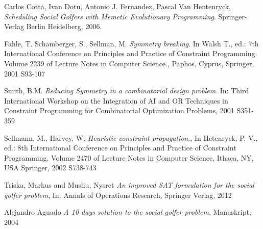     Carlos Cotta, Ivan Dotu, Antonio J. Fernandez, Pascal Van Hentenryck,
    \emph{Scheduling Social Golfers with Memetic Evolutionary Programming}.
    Springer-Verlag Berlin Heidelberg,
    2006.

    Fahle, T. Schamberger, S., Sellman, M.
    \emph{Symmetry breaking}.
    In Walsh T., ed.: 7th International Conference on Principles and Practice of Constraint Programming. Volume 2239 of Lecture Notes in Computer Science., Paphos, Cyprus,
    Springer,
    2001 S93-107

    Smith, B.M.
    \emph{Reducing Symmetry in a combinatorial design problem}.
    In: Third International Workshop on the Integration of AI and OR Techniques in Constraint Programming for Combinatorial Optimization Problems,
    2001 S351-359

    Sellmann, M., Harvey, W.
    \emph{Heuristic constraint propagation}.,
    In Hetenryck, P. V., ed.: 8th International Conference on Principles and Practice of Constraint Programming. Volume 2470 of Lecture Notes in Computer Science,
    Ithaca, NY, USA
    Springer,
    2002 S738-743

    Triska, Markus and Musliu, Nysret
    \emph{An improved SAT formulation for the social golfer problem},
    In: Annals of Operations Research,
    Springer Verlag,
    2012

    Alejandro Aguado
    \emph{A 10 days solution to the social golfer problem},
    Manuskript,
    2004


